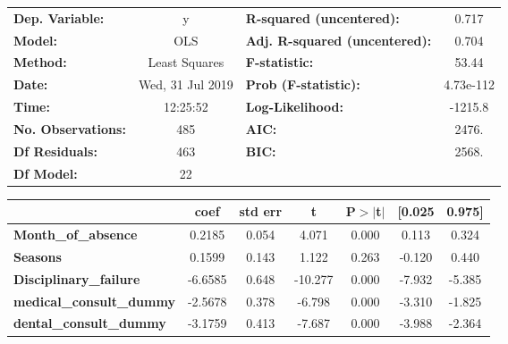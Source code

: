 \documentclass{report}
\begin{document}
\begin{center}
\begin{tabular}{lclc}
\toprule
\textbf{Dep. Variable:}                      &        y         & \textbf{  R-squared (uncentered):}      &     0.717   \\
\textbf{Model:}                              &       OLS        & \textbf{  Adj. R-squared (uncentered):} &     0.704   \\
\textbf{Method:}                             &  Least Squares   & \textbf{  F-statistic:       }          &     53.44   \\
\textbf{Date:}                               & Wed, 31 Jul 2019 & \textbf{  Prob (F-statistic):}          & 4.73e-112   \\
\textbf{Time:}                               &     12:25:52     & \textbf{  Log-Likelihood:    }          &   -1215.8   \\
\textbf{No. Observations:}                   &         485      & \textbf{  AIC:               }          &     2476.   \\
\textbf{Df Residuals:}                       &         463      & \textbf{  BIC:               }          &     2568.   \\
\textbf{Df Model:}                           &          22      & \textbf{                     }          &             \\
\bottomrule
\end{tabular}
\begin{tabular}{lcccccc}
                                             & \textbf{coef} & \textbf{std err} & \textbf{t} & \textbf{P$> |$t$|$} & \textbf{[0.025} & \textbf{0.975]}  \\
\midrule
\textbf{Month\_of\_absence}                  &       0.2185  &        0.054     &     4.071  &         0.000        &        0.113    &        0.324     \\
\textbf{Seasons}                             &       0.1599  &        0.143     &     1.122  &         0.263        &       -0.120    &        0.440     \\
\textbf{Disciplinary\_failure}               &      -6.6585  &        0.648     &   -10.277  &         0.000        &       -7.932    &       -5.385     \\
\textbf{medical\_consult\_dummy}             &      -2.5678  &        0.378     &    -6.798  &         0.000        &       -3.310    &       -1.825     \\
\textbf{dental\_consult\_dummy}              &      -3.1759  &        0.413     &    -7.687  &         0.000        &       -3.988    &       -2.364     \\

\end{tabular}
\end{center}
\end{document}
